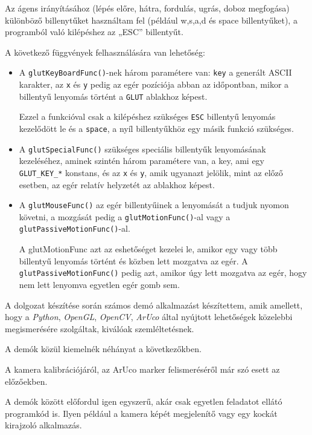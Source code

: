 

Az ágens irányításához (lépés előre, hátra, fordulás, ugrás, doboz megfogása) különböző billenytűket használtam fel (például w,s,a,d és space billentyűket), a  programból való kilépéshez az „ESC” billentyűt. 

A következő függvények felhasználására van lehetőség:
\begin{itemize}
\item A \texttt{glutKeyBoardFunc()}-nek három paramétere van: \texttt{key} a generált ASCII karakter, az \texttt{x} és \texttt{y} pedig az egér pozíciója abban az időpontban, mikor a billentyű lenyomás történt a \texttt{GLUT} ablakhoz képest.

Ezzel a funkcióval csak a kilépéshez szükséges \texttt{ESC} billentyű lenyomás kezelődött le és a \texttt{space}, a nyíl billentyűkhöz egy másik funkció szükséges.
\item A \texttt{glutSpecialFunc()} szükséges speciális billentyűk lenyomásának kezeléséhez,  
aminek szintén három paramétere van, a key, ami egy \texttt{GLUT\_KEY\_*} konstans, és az \texttt{x} és \texttt{y}, amik ugyanazt jelölik, mint az előző esetben, az egér relatív helyzetét az ablakhoz képest.
\item A \texttt{glutMouseFunc()} az egér billentyűinek a lenyomását a  tudjuk nyomon követni, a mozgását pedig a \texttt{glutMotionFunc()}-al vagy a \texttt{glutPassiveMotionFunc()}-al. 

A glutMotionFunc azt az eshetőséget kezelei le, amikor egy vagy több billentyű lenyomás történt és közben lett mozgatva az egér. A \texttt{glutPassiveMotionFunc()} pedig azt, amikor úgy lett mozgatva az egér, hogy nem lett lenyomva egyetlen egér gomb sem.
\end{itemize}


A dolgozat készítése során számos demó alkalmazást készítettem, amik amellett, hogy a \textit{Python}, \textit{OpenGL}, \textit{OpenCV}, \textit{ArUco} által nyújtott lehetőségek közelebbi megismerésére szolgáltak, kiválóak szemléltetésnek.

A demók közül kiemelnék néhányat a következőkben.

A kamera kalibrációjáról, az ArUco marker felismeréséről már szó esett az előzőekben.

A demók között előfordul igen egyszerű, akár csak egyetlen feladatot ellátó programkód is. Ilyen például a kamera képét megjelenítő vagy egy kockát kirajzoló alkalmazás.

